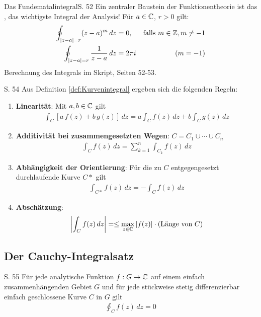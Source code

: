 \begin{bemerkung}{Das Fundematalintegral}{S. 52}
  Ein zentraler Baustein der Funktionentheorie ist das , das wichtigste Integral der Analysis!
  Für $a \in \mathbb{C}$, $r > 0$ gilt:
  \begin{align}
    \oint_{|z-a|=r} (z-a)^m \, dz &= 0, &\text{falls } m \in \mathbb{Z}, m \neq -1 \\
    \oint_{|z-a|=r} \frac{1}{z-a} \, dz &= 2 \pi i & (m = -1)
  \end{align}
  Berechnung des Integrals im Skript, Seiten 52-53.
\end{bemerkung}

\begin{satz}{S. 54}
  Aus Definition \ref{def:Kurvenintegral} ergeben sich die folgenden Regeln:
  \begin{enumerate}[label=\alph*)]
    \item \textbf{Linearität}: Mit $a, b \in \mathbb{C}$ gilt
      \begin{align}
        \int_C \left[ a \, f(z) + b \, g(z) \right] \, dz = a \int_C f(z) \, dz + b \int_C g(z) \, dz
      \end{align}
    \item \textbf{Additivität bei zusammengesetzten Wegen}: $C = C_1 \cup \cdots \cup C_n$
      \begin{align}
        \int_C f(z) \, dz = \sum_{k=1}^n \int_{C_k} f(z) \, dz
      \end{align}
    \item \textbf{Abhängigkeit der Orientierung}: Für die zu $C$ entgegengesetzt durchlaufende Kurve $C*$ gilt
      \begin{align}
        \int_{C*} f(z) \, dz = - \int_{C} f(z) \, dz
      \end{align}
    \item \textbf{Abschätzung}:
      \begin{align}
        \left| \int_{C} f(z) \, dz \right| = \leq \max_{z \in \mathbb{C}} \left| f(z) \right| \cdot (\text{Länge von } C)
      \end{align}
  \end{enumerate}
\end{satz}



\subsection{Der Cauchy-Integralsatz}

\begin{satz}{S. 55}
  \label{satz:cauchy_integralsatz}
  Für jede analytische Funktion $f: G \to \mathbb{C}$ auf einem einfach zusammenhängenden Gebiet $G$ und für jede stückweise stetig differenzierbar einfach geschlossene Kurve $C$ in $G$ gilt
  \begin{align}
    \oint_C f(z) \, dz = 0
  \end{align}
\end{satz}

